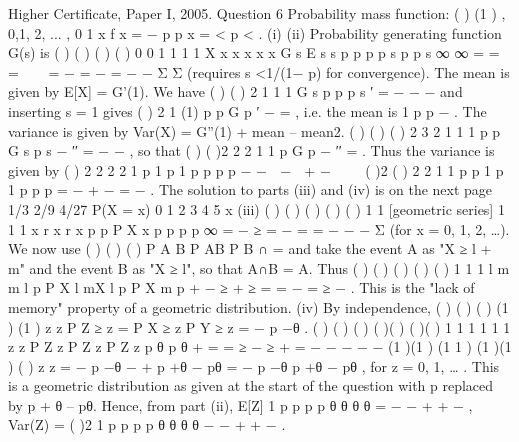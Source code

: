 Higher Certificate, Paper I, 2005. Question 6
Probability mass function: ( ) (1 ) , 0,1, 2, ... , 0 1 x f x = − p p x = < p < .
(i)
(ii) Probability generating function G(s) is
( ) ( ) {( ) } ( ) 0 0
1 1
1 1
X x x x
x x
G s E s s p p p p s p
p s
∞ ∞
= =
=   = − = − = − − Σ Σ
(requires s <1/(1− p) for convergence).
The mean is given by E[X] = G'(1). We have ( )
{ ( ) }2
1
1 1
G s p p
p s
′ = −
− −
and inserting
s = 1 gives ( )
2
1
(1)
p p
G
p
′ − = , i.e. the mean is 1 p
p
− .
The variance is given by Var(X) = G''(1) + mean – mean2. ( ) ( )
{ ( ) }
2
3
2 1
1 1
p p
G s
p s
−
′′ =
− −
, so
that ( ) ( )2
2
2 1
1
p
G
p
−
′′ = . Thus the variance is given by ( ) 2 2
2
2 1 p 1 p 1 p
p p p
− −  −  + − 
 
{( )2 ( )}
2 2
1 1 p p 1 p 1 p
p p
= − + − = − .
The solution to parts (iii) and (iv) is on the next page
1/3
2/9
4/27
P(X = x)
0 1 2 3 4 5
x
(iii) ( ) ( ) ( )
( ) ( ) 1
1 [geometric series] 1
1 1
x
r x
r x
p p
P X x p p p
p
∞
=
−
≥ = − = = −
− − Σ (for x =
0, 1, 2, …). We now use ( ) ( )
( )
P A B
P AB
P B
∩
= and take the event A as "X ≥ l + m"
and the event B as "X ≥ l", so that A∩B = A. Thus
( ) ( )
( )
( ) ( ) 1
1
1
l m
m
l
p
P X l mX l p P X m
p
+ −
≥ + ≥ = = − = ≥
−
.
This is the "lack of memory" property of a geometric distribution.
(iv) By independence, ( ) ( ) ( ) (1 ) (1 ) z z P Z ≥ z = P X ≥ z P Y ≥ z = − p −θ .
( ) ( ) ( ) {( )( )} {( )( )} 1 1 1 1 1 1 z z P Z z P Z z P Z z p θ p θ + = = ≥ − ≥ + = − − − − −
{(1 )(1 )} (1 1 ) {(1 )(1 )} ( ) z z = − p −θ − + p +θ − pθ = − p −θ p +θ − pθ , for z = 0, 1, … .
This is a geometric distribution as given at the start of the question with p replaced by
p + θ – pθ. Hence, from part (ii),
E[Z] 1 p p
p p
θ θ
θ θ
= − − +
+ −
, Var(Z) =
( )2
1 p p
p p
θ θ
θ θ
− − +
+ −
.
